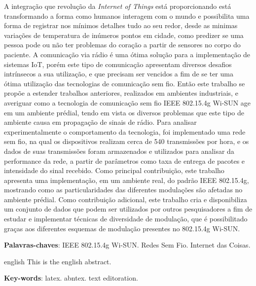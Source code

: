 \setlength{\absparsep}{18pt} %
\begin{resumo}
  A integração que revolução da \emph{Internet of Things} está proporcionando está transformando a forma como humanos interagem com o mundo e possibilita uma forma de registrar nos mínimos detalhes tudo ao seu redor, desde as minimas variações de temperatura de inúmeros pontos em cidade, como predizer se uma pessoa pode ou não ter problemas do coração a partir de sensores no corpo do paciente. A comunicação via rádio é uma ótima solução para a implementação de sistemas IoT, porém este tipo de comunicação apresentam diversos desafios intrínsecos a sua utilização, e que precisam ser vencidos a fim de se ter uma ótima utilização das tecnologias de comunicação sem fio.
  Então este trabalho se propõe a estender trabalhos anteriores, realizados em ambientes industriais, e averiguar como a tecnologia de comunicação sem fio IEEE 802.15.4g Wi-SUN age em um ambiente prédial, tendo em vista os diversos problemas que este tipo de ambiente causa em propagação de sinais de rádio.
  Para analisar experimentalmente o comportamento da tecnologia, foi implementado uma rede sem fio, na qual os dispositivos realizam cerca de 540 transmissões por hora, e os dados de suas transmissões foram armazenados e utilizados para analisar da performance da rede, a partir de parâmetros como taxa de entrega de pacotes e intensidade do sinal recebido.
  Como principal contribuição, este trabalho apresenta uma implementação, em um ambiente real, do padrão IEEE 802.15.4g, mostrando como as particularidades das diferentes modulações são afetadas no ambiente prédial.
  Como contribuição adicional, este trabalho cria e disponibiliza um conjunto de dados que podem ser utilizados por outros pesquisadores a fim de estudar e implementar técnicas de diversidade de modulação, que é possibilitado graças aos diferentes esquemas de modulação presentes no 802.15.4g Wi-SUN.


  \textbf{Palavras-chaves}: IEEE 802.15.4g Wi-SUN. Redes Sem Fio. Internet das Coisas.
\end{resumo}

\begin{resumo}[Abstract]
  \begin{otherlanguage*}{english}
    This is the english abstract.

    \vspace{\onelineskip}

    \noindent
    \textbf{Key-words}: latex. abntex. text editoration.
  \end{otherlanguage*}
\end{resumo}

